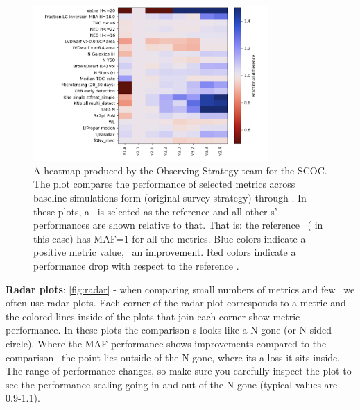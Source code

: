\begin{figure}
    \centering

\includegraphics[width=0.8\textwidth]{figures/v1-v34heatmap.png}
\caption{A heatmap produced by the Observing Strategy team for the SCOC. The plot compares the performance of selected metrics across baseline simulations form  (original survey strategy) through . In these plots, a \opsim\ is selected as the reference and all other \opsim s' performances are shown relative to that. That is: the reference \opsim\ ( in this case) has MAF=1 for all the metrics. Blue colors indicate a positive metric value, \ie\ an improvement. Red colors indicate a performance drop with respect to the reference \opsim.}
\label{fig:heatmap}
\end{figure}

\FloatBarrier

{\bf Radar plots}: \autoref{fig:radar} - when comparing small numbers of metrics and few \opsim\ we often use radar plots. Each corner of the radar plot corresponds to a metric and the colored lines inside of the plots that join each corner show metric performance. In these plots the comparison \opsim s looks like a N-gone (or N-sided circle). Where the MAF performance shows improvements compared to the comparison \opsim\ the point lies outside of the N-gone, where its a loss it sits inside. The range of performance changes, so make sure you carefully inspect the plot to see the performance scaling going in and out of the N-gone (typical values are 0.9-1.1). 

